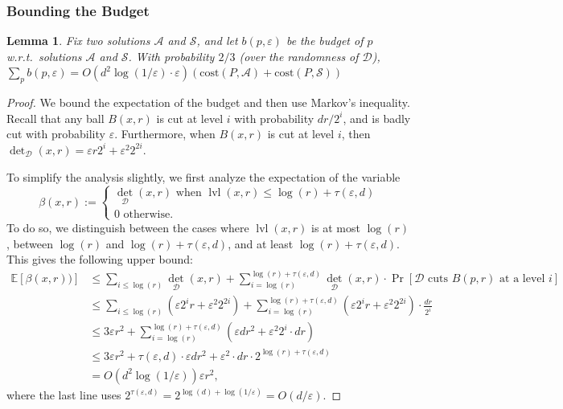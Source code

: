 \documentclass[11pt]{article}
\newtheorem{lemma}[theorem]{Lemma}
\newcommand{\eps}{\varepsilon}
\newcommand{\cost}{\mathrm{cost}}
\newcommand{\E}{\mathbb{E}}
\newcommand{\calD}{\mathcal {D}}
\newcommand{\calS}{\mathcal {S}}
\newcommand{\calL}{\mathcal{A}}
\newcommand{\badcut}{\eps}
\newcommand{\offset}{\tau(\eps, d)}
\DeclareMathOperator{\deto}{det}
\newcommand{\lpar}{\left(}
\newcommand{\rpar}{\right)}
\DeclareMathOperator{\level}{lvl}
\newcommand{\david}[1]{\textcolor{orange}{#1}}
\begin{document}
\subsubsection{Bounding the Budget}
\begin{lemma}\label{lem:budgetBounded}
Fix two solutions $\calL$ and $\calS$, and let $b(p, \eps)$ be the budget of $p$ w.r.t.\ solutions $\calL$ and $\calS$. With probability  $2/3$ (over the randomness of $\calD$),   $\sum_p b(p, \eps) = O(d^2 \log(1/\eps) \cdot \eps) (\cost(P, \calL) + \cost(P, \calS))$
\end{lemma}
\begin{proof}
 We bound the expectation of the budget and then use Markov's inequality. Recall that any ball $B(x, r)$ is cut at level $i$ with probability $d r / 2^i$, and is  badly cut with probability $\badcut$. Furthermore, when $B(x, r)$  is cut at level $i$, then $\deto_\calD(x, r) = \eps r 2^i + \eps^2 2^{2i}$. 
 
 To simplify the analysis slightly, we first analyze the expectation of the variable 
\[\beta(x, r) := \begin{cases}\deto_\calD(x, r) \text{ when } \level(x, r) \leq \log(r) + \offset\\
 0 \text{ otherwise.}\end{cases}\]
 To do so, we distinguish between the cases where $\level(x, r)$ is at most $\log(r)$, between $\log(r)$ and $\log(r) + \offset$, and at least $\log(r) + \offset$. This gives the following upper bound:
 \begin{align*}
     \E[\beta(x, r))]
     &\leq \sum_{i \leq \log(r)} \deto_\calD(x, r) + \sum_{i = \log(r)}^{\log(r) + \offset} \deto_\calD(x, r) \cdot \Pr[\calD \text{ cuts } B(p,r) \text{ at a level } i]\\
     &\leq \sum_{i \leq \log(r)} \lpar \eps  2^i r + \eps^2 2^{2i} \rpar + \sum_{i = \log(r)}^{\log(r) + \offset} \lpar  \eps 2^i r + \eps^2 2^{2i}\rpar \cdot \frac{d r}{2^i}\\%
     &\leq 3\eps r^2 + \sum_{i = \log(r)}^{\log(r) + \offset} \lpar \eps d r^2 +  \eps^2 2^{i}  \cdot d r\rpar\\%
     &\leq 3\eps r^2 + \offset \cdot \eps d r^2 +  \eps^2  \cdot d r \cdot 2^{\log(r) + \offset}\\%
     &= O(d^2\log(1/\eps)) \eps r^2,
 \end{align*}
 where the last line uses $2^{\offset} = 2^{\log(d) + \log(1/\badcut)} = O(d/\eps)$.



\end{proof}
\end{document}
